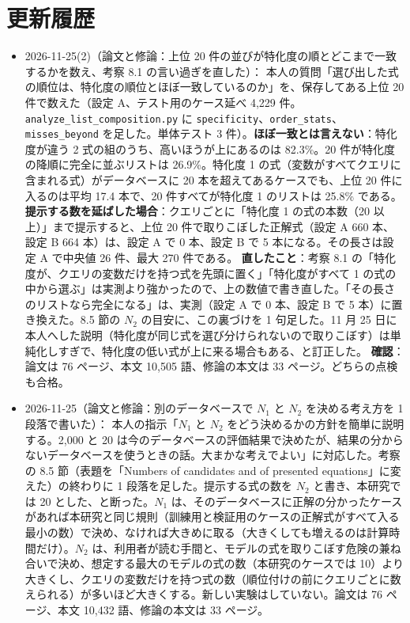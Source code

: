 \documentclass[11pt,a4paper]{jsarticle}
\begin{document}
\section{更新履歴}
\begin{itemize}[nosep]
  \item 2026-11-25(2)（論文と修論：上位 20 件の並びが特化度の順とどこまで一致するかを数え、考察 8.1 の言い過ぎを直した）：
    本人の質問「選び出した式の順位は、特化度の順位とほぼ一致しているのか」を、保存してある上位 20 件で数えた（設定 A、テスト用のケース延べ 4,229 件。\texttt{analyze\_list\_composition.py} に \texttt{specificity}、\texttt{order\_stats}、\texttt{misses\_beyond} を足した。単体テスト 3 件）。\textbf{ほぼ一致とは言えない}：特化度が違う 2 式の組のうち、高いほうが上にあるのは 82.3\%。20 件が特化度の降順に完全に並ぶリストは 26.9\%。特化度 1 の式（変数がすべてクエリに含まれる式）がデータベースに 20 本を超えてあるケースでも、上位 20 件に入るのは平均 17.4 本で、20 件すべてが特化度 1 のリストは 25.8\% である。
    \textbf{提示する数を延ばした場合}：クエリごとに「特化度 1 の式の本数（20 以上）」まで提示すると、上位 20 件で取りこぼした正解式（設定 A 660 本、設定 B 664 本）は、設定 A で 0 本、設定 B で 5 本になる。その長さは設定 A で中央値 26 件、最大 270 件である。
    \textbf{直したこと}：考察 8.1 の「特化度が、クエリの変数だけを持つ式を先頭に置く」「特化度がすべて 1 の式の中から選ぶ」は実測より強かったので、上の数値で書き直した。「その長さのリストなら完全になる」は、実測（設定 A で 0 本、設定 B で 5 本）に置き換えた。8.5 節の $N_2$ の目安に、この裏づけを 1 句足した。11 月 25 日に本人へした説明（特化度が同じ式を選び分けられないので取りこぼす）は単純化しすぎで、特化度の低い式が上に来る場合もある、と訂正した。
    \textbf{確認}：論文は 76 ページ、本文 10,505 語、修論の本文は 33 ページ。どちらの点検も合格。
  \item 2026-11-25（論文と修論：別のデータベースで $N_1$ と $N_2$ を決める考え方を 1 段落で書いた）：
    本人の指示「$N_1$ と $N_2$ をどう決めるかの方針を簡単に説明する。2,000 と 20 は今のデータベースの評価結果で決めたが、結果の分からないデータベースを使うときの話。大まかな考えでよい」に対応した。考察の 8.5 節（表題を「Numbers of candidates and of presented equations」に変えた）の終わりに 1 段落を足した。提示する式の数を $N_2$ と書き、本研究では 20 とした、と断った。$N_1$ は、そのデータベースに正解の分かったケースがあれば本研究と同じ規則（訓練用と検証用のケースの正解式がすべて入る最小の数）で決め、なければ大きめに取る（大きくしても増えるのは計算時間だけ）。$N_2$ は、利用者が読む手間と、モデルの式を取りこぼす危険の兼ね合いで決め、想定する最大のモデルの式の数（本研究のケースでは 10）より大きくし、クエリの変数だけを持つ式の数（順位付けの前にクエリごとに数えられる）が多いほど大きくする。新しい実験はしていない。論文は 76 ページ、本文 10,432 語、修論の本文は 33 ページ。

\end{itemize}
\end{document}
